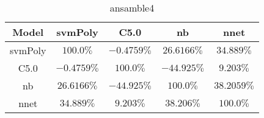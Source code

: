 \begin{table}[!ht]
	\centering
	\begin{tabular}{|c|c|c|c|c|}
		\hline
		Model & svmPoly & C5.0 & nb & nnet \\ \hline
		svmPoly & $100.0\%$ & $-0.4759\%$ & $26.6166\%$ & $34.889\%$ \\ \hline
		C5.0 & $-0.4759\%$ & $100.0\%$ & $-44.925\%$ & $9.203\%$ \\ \hline
		nb & $26.6166\%$ & $-44.925\%$ & $100.0\%$ & $38.2059\%$ \\ \hline
		nnet & $34.889\%$ & $9.203\%$ & $38.206\%$ & $100.0\%$ \\ \hline
	\end{tabular}
	\caption{ansamble4}
	\label{tab:ansamble4}
\end{table}
